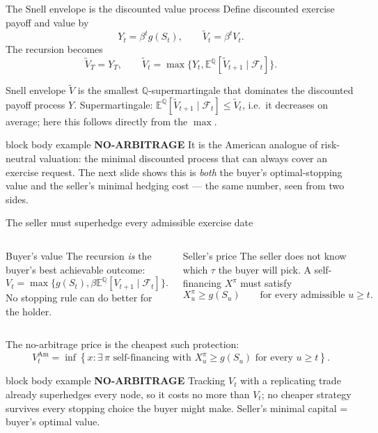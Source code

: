 \documentclass[handout,10pt,aspectratio=169]{beamer}
\newenvironment{marketbox}{\begin{beamercolorbox}[rounded=true,sep=0.7em,wd=\textwidth]{block body example}
  \textbf{\color{CourseGreen}NO-ARBITRAGE}\quad}{\end{beamercolorbox}}
\newcommand{\E}{\mathbb E}
\newcommand{\Q}{\mathbb Q}
\newcommand{\cF}{\mathcal F}
\begin{document}
\begin{frame}{The Snell envelope is the discounted value process}
\small
Define discounted exercise payoff and value by
\[
Y_t=\beta^t g(S_t),\qquad \widetilde V_t=\beta^tV_t.
\]
The recursion becomes
\[
\widetilde V_T=Y_T,\qquad
\widetilde V_t=\max\bigl\{Y_t,\E^\Q[\widetilde V_{t+1}\mid\cF_t]\bigr\}.
\]
\begin{block}{Snell envelope}
\(\widetilde V\) is the smallest \(\Q\)-supermartingale that dominates the
discounted payoff process \(Y\). Supermartingale:
\(\E^\Q[\widetilde V_{t+1}\mid\cF_t]\leq\widetilde V_t\), i.e.\ it decreases
on average; here this follows directly from the \(\max\).
\end{block}
\begin{marketbox}
It is the American analogue of risk-neutral valuation: the minimal
discounted process that can always cover an exercise request. The next
slide shows this is \emph{both} the buyer's optimal-stopping value and the
seller's minimal hedging cost --- the same number, seen from two sides.
\end{marketbox}
\end{frame}

\begin{frame}{The seller must superhedge every admissible exercise date}
\small
\begin{columns}[T,onlytextwidth]
\begin{block}{Buyer's value}
The recursion \emph{is} the buyer's best achievable outcome:
\[
V_t=\max\{g(S_t),\beta\E^\Q[V_{t+1}\mid\cF_t]\}.
\]
No stopping rule can do better for the holder.
\end{block}
\begin{exampleblock}{Seller's price}
The seller does not know which \(\tau\) the buyer will pick. A
self-financing \(X^\pi\) must satisfy
\[
  X^\pi_u\geq g(S_u)
  \qquad\text{for every admissible }u\geq t.
\]
\end{exampleblock}
\end{columns}
The no-arbitrage price is the cheapest such protection:
\[
\boxed{V_t^{\mathrm{Am}}
=\inf\left\{x:\exists\,\pi\text{ self-financing with }
X_u^\pi\geq g(S_u)\text{ for every }u\geq t\right\}.}
\]
\begin{marketbox}
Tracking \(V_t\) with a replicating trade already superhedges every node, so
it costs no more than \(V_t\); no cheaper strategy survives every stopping
choice the buyer might make. Seller's minimal capital = buyer's optimal
value.
\end{marketbox}
\end{frame}
\end{document}
